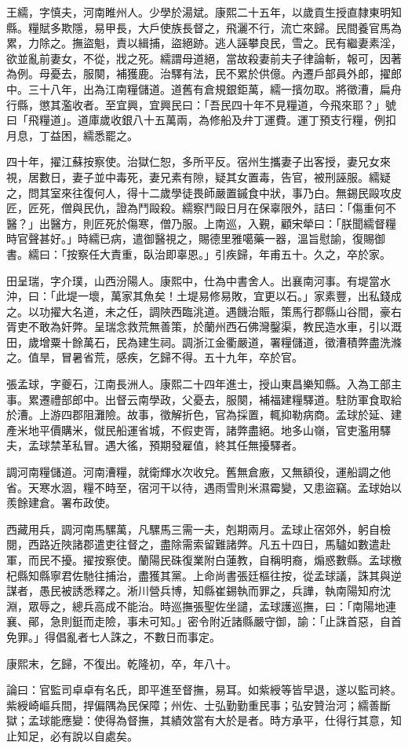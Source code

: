 \begin{pinyinscope}
王繻，字慎夫，河南睢州人。少學於湯斌。康熙二十五年，以歲貢生授直隸東明知縣。糧賦多欺隱，易甲長，大戶使族長督之，飛灑不行，流亡來歸。民間養官馬為累，力除之。撫盜魁，責以緝捕，盜絕跡。逃人誣攀良民，雪之。民有繼妻素淫，欲並亂前妻女，不從，戕之死。繻謂母道絕，當故殺妻前夫子律論斬，報可，因著為例。母憂去，服闋，補獲鹿。治驛有法，民不累於供億。內遷戶部員外郎，擢郎中。三十八年，出為江南糧儲道。道舊有倉規銀鉅萬，繻一擯勿取。將徵漕，扁舟行縣，懲其濫收者。至宜興，宜興民曰：「吾民四十年不見糧道，今飛來耶？」號曰「飛糧道」。道庫歲收銀八十五萬兩，為修船及弁丁運費。運丁預支行糧，例扣月息，丁益困，繻悉罷之。

四十年，擢江蘇按察使。治獄仁恕，多所平反。宿州生攜妻子出客授，妻兄女來視，居數日，妻子並中毒死，妻兄素有隙，疑其女置毒，告官，被刑誣服。繻疑之，問其室來往復何人，得十二歲學徒畏師嚴置鏚食中狀，事乃白。無錫民毆攻皮匠，匠死，僧與民仇，證為鬥毆殺。繻察鬥毆日月在保辜限外，詰曰：「傷重何不醫？」出醫方，則匠死於傷寒，僧乃服。上南巡，入覲，顧宋犖曰：「朕聞繻督糧時官聲甚好。」時繻已病，遣御醫視之，賜德里雅噶藥一器，溫旨慰諭，復賜御書。繻曰：「按察任大責重，臥治即辜恩。」引疾歸，年甫五十。久之，卒於家。

田呈瑞，字介璞，山西汾陽人。康熙中，仕為中書舍人。出襄南河事。有堤當水沖，曰：「此堤一壞，萬家其魚矣！土堤易修易敗，宜更以石。」家素豐，出私錢成之。以功擢大名道，未之任，調陜西臨洮道。遇饑治賑，策馬行郡縣山谷間，豪右胥吏不敢為奸弊。呈瑞念救荒無善策，於蘭州西石佛灣鑿渠，教民造水車，引以溉田，歲增粟十餘萬石，民為建生祠。調浙江金衢嚴道，署糧儲道，徵漕積弊盡洗滌之。值旱，冒暑省荒，感疾，乞歸不得。五十九年，卒於官。

張孟球，字夔石，江南長洲人。康熙二十四年進士，授山東昌樂知縣。入為工部主事。累遷禮部郎中。出督云南學政，父憂去，服闋，補福建糧驛道。駐防軍食取給於漕。上游四郡阻灘險。故事，徵解折色，官為採置，輒抑勒病商。孟球於延、建產米地平價購米，僦民船運省城，不假吏胥，諸弊盡絕。地多山嶺，官吏濫用驛夫，孟球禁革私冒。遇大徭，預期發雇值，終其任無擾驛者。

調河南糧儲道。河南漕糧，就衛輝水次收兌。舊無倉廒，又無額役，運船調之他省。天寒水涸，糧不時至，宿河干以待，遇雨雪則米濕霉變，又患盜竊。孟球始以羨餘建倉。署布政使。

西藏用兵，調河南馬騾萬，凡騾馬三需一夫，剋期兩月。孟球止宿郊外，躬自檢閱，西路近陜諸郡遣吏往督之，盡除需索留難諸弊。凡五十四日，馬驢如數遣赴軍，而民不擾。擢按察使。蘭陽民硃復業附白蓮教，自稱明裔，煽惑數縣。孟球檄杞縣知縣寧君佐馳往捕治，盡獲其黨。上命尚書張廷樞往按，從孟球議，誅其與逆謀者，愚民被誘悉釋之。淅川營兵博，知縣崔錫執而罪之，兵譁，執南陽知府沈淵，眾辱之，總兵高成不能治。時巡撫張聖佐坐譴，孟球護巡撫，曰：「南陽地連襄、鄖，急則鋌而走險，事未可知。」密令附近諸縣嚴守御，諭：「止誅首惡，自首免罪。」得倡亂者七人誅之，不數日而事定。

康熙末，乞歸，不復出。乾隆初，卒，年八十。

論曰：官監司卓卓有名氏，即平進至督撫，易耳。如紫綬等皆早退，遂以監司終。紫綬崎嶇兵間，捍偏隅為民保障；州佐、士弘勤勤重民事；弘安贊治河；繻善斷獄；孟球能應變：使得為督撫，其績效當有大於是者。時方承平，仕得行其意，知止知足，必有說以自處矣。


\end{pinyinscope}
